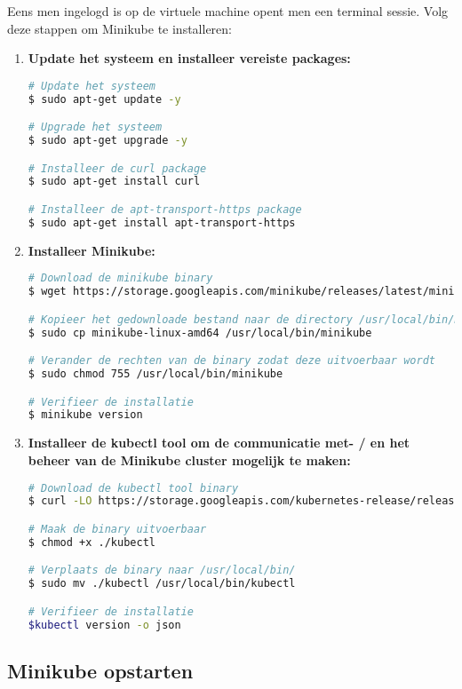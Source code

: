Eens men ingelogd is op de virtuele machine opent men een terminal sessie. 
Volg deze stappen om Minikube te installeren: \autocite{Simic2020}
\begin{enumerate}
    \item {\bf Update het systeem en installeer vereiste packages:}
\begin{lstlisting}[language=bash]
# Update het systeem
$ sudo apt-get update -y

# Upgrade het systeem
$ sudo apt-get upgrade -y

# Installeer de curl package
$ sudo apt-get install curl

# Installeer de apt-transport-https package
$ sudo apt-get install apt-transport-https
    \end{lstlisting}

    \item {\bf Installeer Minikube:}
\begin{lstlisting}[language=bash]
# Download de minikube binary
$ wget https://storage.googleapis.com/minikube/releases/latest/minikube-linux-amd64

# Kopieer het gedownloade bestand naar de directory /usr/local/bin/minikube
$ sudo cp minikube-linux-amd64 /usr/local/bin/minikube

# Verander de rechten van de binary zodat deze uitvoerbaar wordt
$ sudo chmod 755 /usr/local/bin/minikube

# Verifieer de installatie
$ minikube version
\end{lstlisting}

    \item {\bf Installeer de kubectl tool om de communicatie met- / en het beheer van de Minikube cluster mogelijk te maken:}
\begin{lstlisting}[language=bash]
# Download de kubectl tool binary
$ curl -LO https://storage.googleapis.com/kubernetes-release/release/`curl -s https://storage.googleapis.com/kubernetes-release/release/stable.txt`/bin/linux/amd64/kubectl

# Maak de binary uitvoerbaar
$ chmod +x ./kubectl

# Verplaats de binary naar /usr/local/bin/
$ sudo mv ./kubectl /usr/local/bin/kubectl

# Verifieer de installatie
$kubectl version -o json
\end{lstlisting}
    
\end{enumerate} 

\subsection{Minikube opstarten}

